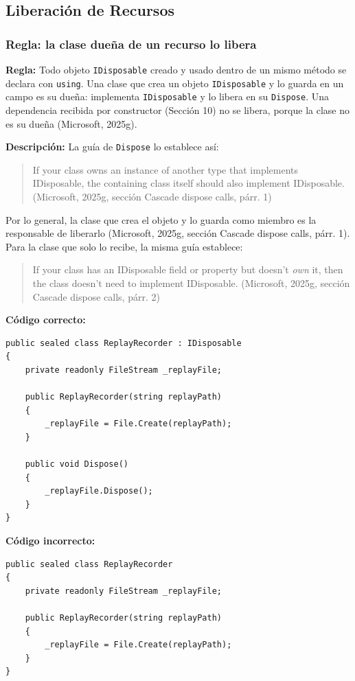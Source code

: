 \subsection{Liberación de Recursos}

\subsubsection{Regla: la clase dueña de un recurso lo libera}

\textbf{Regla:} Todo objeto \texttt{IDisposable} creado y usado dentro de un mismo método se declara con \texttt{using}. Una clase que crea un objeto \texttt{IDisposable} y lo guarda en un campo es su dueña: implementa \texttt{IDisposable} y lo libera en su \texttt{Dispose}. Una dependencia recibida por constructor (Sección 10) no se libera, porque la clase no es su dueña (Microsoft, 2025g).

\textbf{Descripción:} La guía de \texttt{Dispose} lo establece así:
\begin{quote}
If your class owns an instance of another type that implements IDisposable, the containing class itself should also implement IDisposable. (Microsoft, 2025g, sección Cascade dispose calls, párr. 1)
\end{quote}
\noindent Por lo general, la clase que crea el objeto y lo guarda como miembro es la responsable de liberarlo (Microsoft, 2025g, sección Cascade dispose calls, párr. 1). Para la clase que solo lo recibe, la misma guía establece:
\begin{quote}
If your class has an IDisposable field or property but doesn't \emph{own} it, then the class doesn't need to implement IDisposable. (Microsoft, 2025g, sección Cascade dispose calls, párr. 2)
\end{quote}

\textbf{Código correcto:}
\begin{lstlisting}[style=csharpstyle]
public sealed class ReplayRecorder : IDisposable
{
    private readonly FileStream _replayFile;

    public ReplayRecorder(string replayPath)
    {
        _replayFile = File.Create(replayPath);
    }

    public void Dispose()
    {
        _replayFile.Dispose();
    }
}
\end{lstlisting}

\textbf{Código incorrecto:}
\begin{lstlisting}[style=csharpstyle]
public sealed class ReplayRecorder
{
    private readonly FileStream _replayFile;

    public ReplayRecorder(string replayPath)
    {
        _replayFile = File.Create(replayPath);
    }
}
\end{lstlisting}

